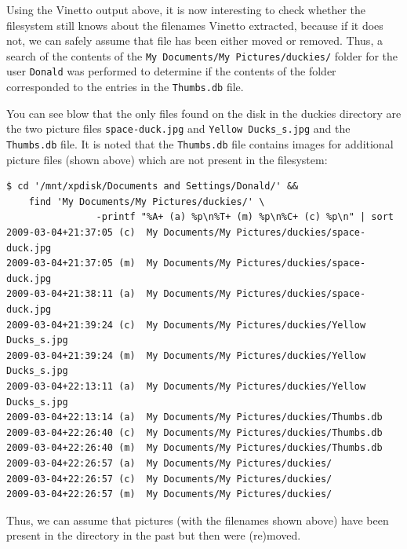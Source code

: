 \documentclass[a4paper,
    11pt,
    normalheadings,
    parindent,
    UKenglish,
    abstracton,
    ]{scrartcl}
\begin{document}
Using the Vinetto output above, it is now interesting to check whether the filesystem still knows about the filenames Vinetto extracted, because if it does not, we can safely assume that file has been either moved or removed.
Thus, a search of the contents of the {\tt My Documents/My Pictures/duckies/} folder for the user {\tt Donald} was performed to determine if the contents of the folder corresponded to the entries in the \texttt{Thumbs.db} file.

You can see blow that the only files found on the disk in the duckies directory are the two picture files \texttt{space-duck.jpg} and \texttt{Yellow Ducks\_s.jpg} and the \texttt{Thumbs.db} file.
It is noted that the \texttt{Thumbs.db} file contains images for additional picture files (shown above) which are not present in the filesystem:
\begin{verbatim}
$ cd '/mnt/xpdisk/Documents and Settings/Donald/' &&
    find 'My Documents/My Pictures/duckies/' \
                -printf "%A+ (a) %p\n%T+ (m) %p\n%C+ (c) %p\n" | sort
2009-03-04+21:37:05 (c)  My Documents/My Pictures/duckies/space-duck.jpg
2009-03-04+21:37:05 (m)  My Documents/My Pictures/duckies/space-duck.jpg
2009-03-04+21:38:11 (a)  My Documents/My Pictures/duckies/space-duck.jpg
2009-03-04+21:39:24 (c)  My Documents/My Pictures/duckies/Yellow Ducks_s.jpg
2009-03-04+21:39:24 (m)  My Documents/My Pictures/duckies/Yellow Ducks_s.jpg
2009-03-04+22:13:11 (a)  My Documents/My Pictures/duckies/Yellow Ducks_s.jpg
2009-03-04+22:13:14 (a)  My Documents/My Pictures/duckies/Thumbs.db
2009-03-04+22:26:40 (c)  My Documents/My Pictures/duckies/Thumbs.db
2009-03-04+22:26:40 (m)  My Documents/My Pictures/duckies/Thumbs.db
2009-03-04+22:26:57 (a)  My Documents/My Pictures/duckies/
2009-03-04+22:26:57 (c)  My Documents/My Pictures/duckies/
2009-03-04+22:26:57 (m)  My Documents/My Pictures/duckies/
\end{verbatim}

Thus, we can assume that pictures (with the filenames shown above) have been present in the directory in the past but then were (re)moved.
\end{document}
